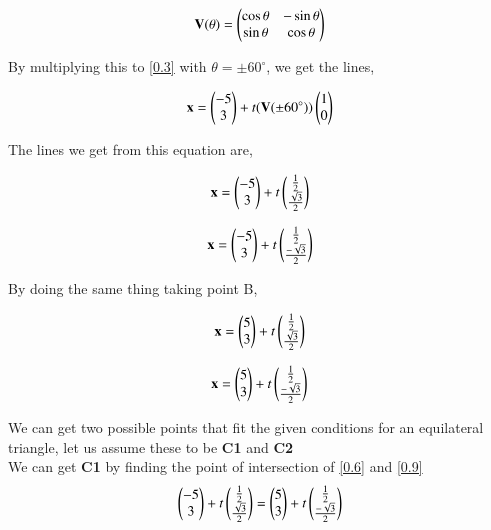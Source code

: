\documentclass[journal]{IEEEtran}
\begin{document}
\begin{align}
    \textbf{V}(\theta) = \begin{pmatrix}\cos\theta & -\sin\theta \\\sin\theta & \cos\theta\end{pmatrix}
    \label{0.4}
\end{align}

By multiplying this to \ref{0.3} with $\theta = \pm 60^{\circ}$, we get the lines,

\begin{align}
    \textbf{x} = \begin{pmatrix}-5\\3\end{pmatrix} + t(\textbf{V}(\pm 60^{\circ}))\begin{pmatrix}1\\0\end{pmatrix}
    \label{0.5}
\end{align}

The lines we get from this equation are,

\begin{align}
    \textbf{x} = \begin{pmatrix}-5\\3\end{pmatrix}+t\begin{pmatrix}\frac{1}{2}\\\frac{\sqrt{3}}{2}\end{pmatrix}
    \label{0.6}
\end{align}

\begin{align}
    \textbf{x} = \begin{pmatrix}-5\\3\end{pmatrix}+t\begin{pmatrix}\frac{1}{2}\\\frac{-\sqrt{3}}{2}\end{pmatrix}
    \label{0.7}
\end{align}

By doing the same thing taking point B,

\begin{align}
    \textbf{x} = \begin{pmatrix}5\\3\end{pmatrix}+t\begin{pmatrix}\frac{1}{2}\\\frac{\sqrt{3}}{2}\end{pmatrix}
    \label{0.8}
\end{align}

\begin{align}
    \textbf{x} = \begin{pmatrix}5\\3\end{pmatrix}+t\begin{pmatrix}\frac{1}{2}\\\frac{-\sqrt{3}}{2}\end{pmatrix}
    \label{0.9}
\end{align}

We can get two possible points that fit the given conditions for an equilateral triangle, let us assume these to be \textbf{C1} and \textbf{C2}\\

We can get \textbf{C1} by finding the point of intersection of \ref{0.6} and \ref{0.9}
\begin{align}
    \begin{pmatrix}-5\\3\end{pmatrix} + t\begin{pmatrix}\frac{1}{2}\\\frac{\sqrt{3}}{2}\end{pmatrix} = \begin{pmatrix}5\\3\end{pmatrix} +t\begin{pmatrix}\frac{1}{2}\\\frac{-\sqrt{3}}{2}\end{pmatrix}
    \label{0.10}
\end{align}
\end{document}
